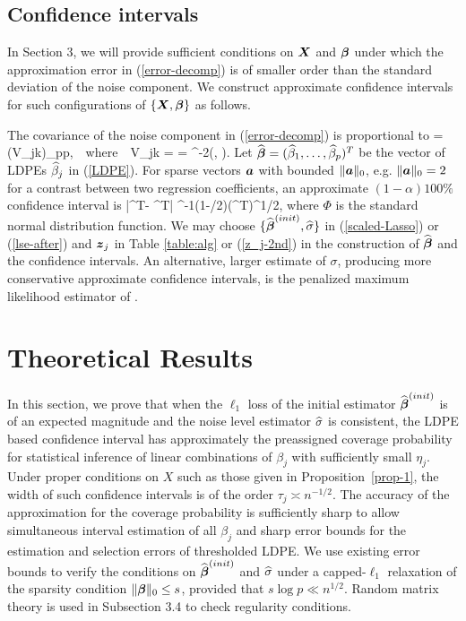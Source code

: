 \documentclass[11pt]{amsart}
\begin{document}
\subsection{Confidence intervals} 
In Section 3, we will provide sufficient conditions on $\boldsymbol{X}$ and $\boldsymbol{\beta}$ 
under which the approximation error 
in (\ref{error-decomp}) is of smaller order than the standard deviation of the noise 
component. 
We construct approximate confidence intervals for such configurations 
of $\{\boldsymbol{X},\boldsymbol{\beta}\}$ as follows. 

The covariance of the noise component in (\ref{error-decomp}) is proportional to  
\bV=(V_{jk})_{p\times p},\ \hbox{ where }\ 
V_{jk} = 
= \sigma^{-2}\Cov\Big(, \Big). 
\eel
Let ${\widehat{\boldsymbol{\beta}}} = (\widehat{\beta}_1,\ldots,\widehat{\beta}_p)^T$ be the vector of LDPEs $\widehat{\beta}_j$ in (\ref{LDPE}). 
For sparse vectors $\boldsymbol{a}$ with bounded $\|\boldsymbol{a}\|_0$, 
e.g. $\|\boldsymbol{a}\|_0=2$ for a contrast between two regression coefficients, 
an approximate $(1-\alpha)100\%$ confidence interval is 
\big|\ba^T\hbbeta - \ba^T\bbeta\big| \le \hsigma\Phi^{-1}(1-\alpha/2)(\ba^T\bV\ba)^{1/2}, 
\eel
where $\Phi$ is the standard normal distribution function.
We may choose $\{{\widehat{\boldsymbol{\beta}}}^{(init)},\widehat{\sigma}\}$ in (\ref{scaled-Lasso}) or (\ref{lse-after}) 
and $\boldsymbol{z}_j$ in Table \ref{table:alg} or (\ref{z_j-2nd}) %
in the construction of ${\widehat{\boldsymbol{\beta}}}$ and the confidence intervals. 
An alternative, larger estimate of $\sigma$, producing more conservative approximate 
confidence intervals, is the penalized maximum likelihood estimator of \cite{StadlerBG10}. 

\section{Theoretical Results} 
{In this section, we prove that when the $\ell_1$ loss of the initial estimator ${\widehat{\boldsymbol{\beta}}}^{(init)}$ is of 
an expected magnitude and the noise level estimator $\widehat{\sigma}$ is consistent, 
the LDPE based confidence interval has approximately the preassigned coverage probability 
for statistical inference of linear combinations of $\beta_j$ with sufficiently small $\eta_j$. Under proper conditions on 
$X$ such as those given in Proposition~\ref{prop-1}, the width of such confidence intervals 
is of the order $\tau_j\asymp n^{-1/2}$. 
The accuracy of the approximation for the coverage probability is sufficiently sharp to allow 
simultaneous interval estimation of all $\beta_j$ and sharp error bounds for the estimation 
and selection errors of thresholded LDPE. 
We use existing error bounds to verify the conditions on ${\widehat{\boldsymbol{\beta}}}^{(init)}$ and $\widehat{\sigma}$ 
under a capped-$\ell_1$ relaxation of the sparsity condition $\|\boldsymbol{\beta}\|_0\le s$, provided that $s\log p\ll n^{1/2}$. 
Random matrix theory is used in Subsection 3.4 to check regularity conditions. }
\end{document}
